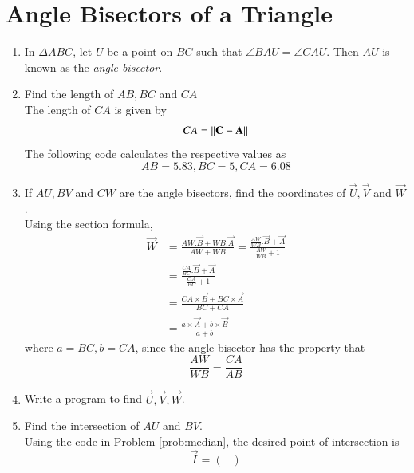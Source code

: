 \documentclass[journal,12pt,twocolumn]{IEEEtran}
\renewcommand\thesection{\arabic{section}}
\begin{document}
\section{Angle Bisectors of a Triangle}
%
\begin{enumerate}[label=\thesection.\arabic*
,ref=\thesection.\theenumi]

\item
In $\Delta ABC$, let $U$ be a point on $BC$ such that $\angle BAU = \angle CAU$. Then $AU$ is known as the {\em angle bisector}.

\item
Find the length of $AB,BC$ and $CA$
\\
\solution The length of $CA$ is given by
\begin{align}
CA = \lVert\mathbf{C}-\mathbf{A}\rVert
\end{align}
The following code calculates the respective values as
%
\begin{equation}
AB =  5.83, BC =  5, CA =  6.08
\end{equation}
%

\item
If $AU,BV$ and $CW$ are the angle bisectors, find the coordinates of $\vec{U},\vec{V}$ and $\vec{W}$.
\\
\solution Using the section formula,
\begin{align}
\vec{W} &= \frac{AW.\vec{B}+WB.\vec{A}}{AW + WB} = \frac{\frac{AW}{WB}.\vec{B}+\vec{A}}{\frac{AW}{WB} + 1}
\\
&= \frac{\frac{CA}{BC}.\vec{B}+\vec{A}}{\frac{CA}{BC} + 1}
\\
&= \frac{{CA}\times \vec{B}+{BC}\times \vec{A}}{{BC} + {CA}}
\\
&= \frac{a\times \vec{A} + b\times \vec{B}}{a + b}
\end{align}
where $a = BC, b = CA$, 
since the angle bisector has the property that
%
\begin{equation}
\frac{AW}{WB} = \frac{CA}{AB}
\end{equation}
%
\item Write a program to find $\vec{U},\vec{V},\vec{W}$.
%
%
\item
Find the intersection of $AU$ and $BV$.%
\\
\solution Using the code in Problem \ref{prob:median}, the desired point of intersection is
\begin{equation}
\vec{I} = 
\begin{pmatrix}

\end{pmatrix}
\end{equation}
\end{enumerate}
\end{document}

